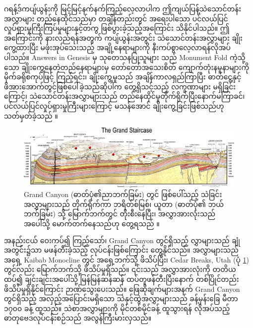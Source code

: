 \documentclass[10pt,twocolumn,letterpaper]{article}
\begin{document}
ဂရန့်ဒ်ကပျ်ယွန်းကို မြင့်မြင့်နက်နက်ကြည့်လေ့လာပါက ဤကျယ်ပြန့်သဲသောင်တန်းအလွှာများ တည်နေထိုင်သည်မှာ တချိန်တည်းတွင် အရေးပါသော ပင်လယ်ပြင်လှုပ်ရှားမှုကြီးကြပ်မှုများနှင့်တကွ ဖြစ်ပွားခဲ့သည့်အကြောင်း သိနိုင်ပါသည်။ ဤအကြောင်းကို နားလည်ရန်အတွက် ကပျ်ယွန်းအတွင်း သဲသောင်တန်းအလွှာများ ချိုးကွေ့ထားပြီး မဖုံးအုပ်သေးသည့် အချို့နေရာများကို နီးကပ်စွာလေ့လာရန်လိုအပ်ပါသည်။ Answers in Genesis မှ သုတေသနပြုသူများ \cite{42} သည် Monument Fold ကဲ့သို့သော ချိုးကွေ့နေတဲ့တည်နေရာများမှ တော်တော်အသေးစိတ် ကျောက်တုံးနမူနာများကို မိုက်ခရိုစကုပ်ဖြင့် ကြည့်ရင်း၊ ချိုးကွေ့မှုသည် အချိန်ကာလရှည်ကြာပြီး ဓာတ်ငွေ့နှင့် ဖိအားအောက်တွင်ဖြစ်ပေါ်ခဲ့သည်ဆိုပါက တွေ့ရှိသင့်သည့် လက္ခဏာများ မရှိခြင်းကြောင့်၊ သဲသောင်တန်းအလွှာများသည် တည်နေထိုင်မှုတိုက်ရိုက်ပြီးနောက်မကြာခင်၊ ပင်လယ်ပြင်လှုပ်ရှားမှုကြီးများကြောင့် မသန်အောင် ချိုးကွေ့ခြင်းဖြစ်သည်ဟု သတ်မှတ်ခဲ့သည် \cite{43}။

\begin{figure}
\begin{center}

\includegraphics[width=1\textwidth]{Grand_Staircase-big.jpg}
\end{center}
   \caption{Grand Canyon (ဓာတ်ပုံ၏ညာဘက်ခြမ်း) တွင် ဖြစ်ပေါ်သည့် သဲခြင်းအလွှာများသည် တိုက်ရိုက်ကာ ဘရိတ်စ်မြစ်၊ ယူတာ (ဓာတ်ပုံ၏ ဘယ်ဘက်ခြမ်း) သို့ မြောက်ဘက်တွင် တိုးစီးနေပြီး၊ အလွှာအားလုံးသည် အပေါ်သို့ မောက်တက်နေသည်ဟု တွေ့ရသည် \cite{50}။}
\label{fig:4}
\end{figure}

အနည်းငယ် ဝေးကပ်၍ ကြည့်သော်၊ Grand Canyon တွင်ရှိသည့် လွှာများသည် ချုံအတွင်း၌သာ မဖန်တီးခဲ့သည့် လုပ်ငန်းဖြစ်ကြောင်း တွေ့နိုင်သည်။ အလွှာများသည် အရှေ့ Kaibab Monocline \cite{46} တွင် အရှေ့ဘက်သို့ ဖိသိပ်ပြီး၊ Cedar Breaks, Utah (ပုံ \ref{fig:4}) တွင်လည်း မြောက်ဘက်သို့ ဖိသိပ်မှုရှိသည်။ ၎င်းသည် အလွှာအားလုံးကို တတိယထပ်၍ ချင်းချင်းအပေါ်သို့ မြန်မြန်ဆန်ဆန် ထပ်တူဖန်တီးပြီးနောက် တစ်ပြိုင်တည်း ဖိသိပ်မှုရှိနိုင်ကြောင်း ဉာဏ်သွေးပေးသည်။ ဖြေဆိုချက်များအနက် Grand Canyon တွင်ရှိသည့် အလှည့်အပြောင်းမရှိသော သဲနှင့်ထွဲအလွှာများသည် ခန့်မှန်းခြေ မီတာ ၁၇၀၀ ခန့် ထူသည်။ သဲစာအလွှာများကို မိုင်တစ်မိုင်ခန့် ထူသွားရန် လိုအပ်သည့် ဓာတုဗေဒလုပ်ငန်းစဉ်သည် အလွန်ကြီးမားလှသည်။
\end{document}
